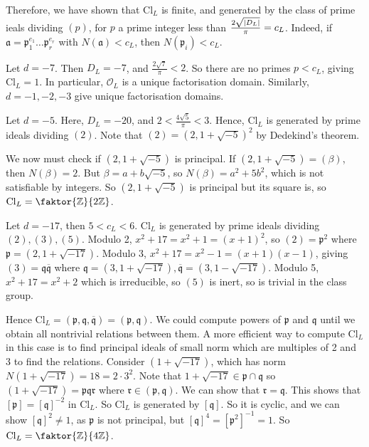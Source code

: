 Therefore, we have shown that \( \mathrm{Cl}_L \) is finite, and generated by the class of prime ieals dividing \( (p) \), for \( p \) a prime integer less than \( \frac{2\sqrt{\abs{D_L}}}{\pi} = c_L \).
Indeed, if \( \mathfrak a = \mathfrak p_1^{e_1} \dots \mathfrak p_r^{e_r} \) with \( N(\mathfrak a) < c_L \), then \( N(\mathfrak p_i) < c_L \).
\begin{example}
    Let \( d = -7 \).
    Then \( D_L = -7 \), and \( \frac{2\sqrt{7}}{\pi} < 2 \).
    So there are no primes \( p < c_L \), giving \( \mathrm{Cl}_L = \qty{1} \).
    In particular, \( \mathcal O_L \) is a unique factorisation domain.
    Similarly, \( d = -1, -2, -3 \) give unique factorisation domains.
\end{example}
\begin{example}
    Let \( d = -5 \).
    Here, \( D_L = -20 \), and \( 2 < \frac{4\sqrt{5}}{\pi} < 3 \).
    Hence, \( \mathrm{Cl}_L \) is generated by prime ideals dividing \( (2) \).
    Note that \( (2) = (2, 1 + \sqrt{-5})^2 \) by Dedekind's theorem.

    We now must check if \( (2, 1 + \sqrt{-5}) \) is principal.
    If \( (2, 1 + \sqrt{-5}) = (\beta) \), then \( N(\beta) = 2 \).
    But \( \beta = a + b\sqrt{-5} \), so \( N(\beta) = a^2 + 5 b^2 \), which is not satisfiable by integers.
    So \( (2, 1 + \sqrt{-5}) \) is principal but its square is, so \( \mathrm{Cl}_L = \faktor{\mathbb Z}{2\mathbb Z} \).
\end{example}
\begin{example}
    Let \( d = -17 \), then \( 5 < c_L < 6 \).
    \( \mathrm{Cl}_L \) is generated by prime ideals dividing \( (2), (3), (5) \).
    Modulo 2, \( x^2 + 17 = x^2 + 1 = (x + 1)^2 \), so \( (2) = \mathfrak p^2 \) where \( \mathfrak p = (2, 1 + \sqrt{-17}) \).
    Modulo 3, \( x^2 + 17 = x^2 - 1 = (x + 1)(x - 1) \), giving \( (3) = \mathfrak q \overline{\mathfrak q} \) where \( \mathfrak q = (3, 1 + \sqrt{-17}), \overline{\mathfrak q} = (3, 1 - \sqrt{-17}) \).
    Modulo 5, \( x^2 + 17 = x^2 + 2 \) which is irreducible, so \( (5) \) is inert, so is trivial in the class group.

    Hence \( \mathrm{Cl}_L = (\mathfrak p, \mathfrak q, \overline{\mathfrak q}) = (\mathfrak p, \mathfrak q) \).
    We could compute powers of \( \mathfrak p \) and \( \mathfrak q \) until we obtain all nontrivial relations between them.
    A more efficient way to compute \( \mathrm{Cl}_L \) in this case is to find principal ideals of small norm which are multiples of 2 and 3 to find the relations.
    Consider \( (1 + \sqrt{-17}) \), which has norm \( N(1 + \sqrt{-17}) = 18 = 2 \cdot 3^2 \).
    Note that \( 1 + \sqrt{-17} \in \mathfrak p \cap \mathfrak q \) so \( (1 + \sqrt{-17}) = \mathfrak p \mathfrak q \mathfrak r \) where \( \mathfrak r \in (\mathfrak p, \mathfrak q) \).
    We can show that \( \mathfrak r = \mathfrak q \).
    This shows that \( [\mathfrak p] = [\mathfrak q]^{-2} \) in \( \mathrm{Cl}_L \).
    So \( \mathrm{Cl}_L \) is generated by \( [\mathfrak q] \).
    So it is cyclic, and we can show \( [\mathfrak q]^2 \neq 1 \), as \( \mathfrak p \) is not principal, but \( [\mathfrak q]^4 = [\mathfrak p^2]^{-1} = 1 \).
    So \( \mathrm{Cl}_L = \faktor{\mathbb Z}{4\mathbb Z} \).
\end{example}

